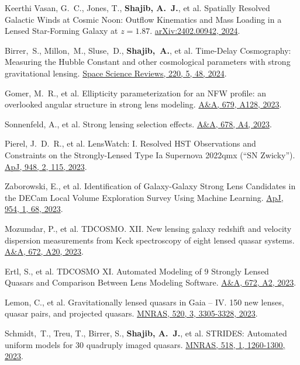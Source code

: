 \documentclass[margin, line]{res}
\begin{document}
\begin{resume}
\begin{etaremune}
	\item Keerthi Vasan, G.~C., Jones, T., \textbf{Shajib, A.~J.}, et al. Spatially Resolved Galactic Winds at Cosmic Noon: Outflow Kinematics and Mass Loading in a Lensed Star-Forming Galaxy at $z=1.87$. \href{https://arxiv.org/abs/2402.00942}{arXiv:2402.00942, 2024}.
	\item Birrer,~S., Millon,~M., Sluse,~D., \textbf{Shajib,~A.}, et al. Time-Delay Cosmography: Measuring the Hubble Constant and other cosmological parameters with strong gravitational lensing. \href{https://ui.adsabs.harvard.edu/abs/2024SSRv..220...48B/abstract}{Space Science Reviews, 220, 5, 48, 2024}.
	\item Gomer, M.~R., et al. Ellipticity parameterization for an NFW profile: an overlooked angular structure in strong lens modeling. \href{https://ui.adsabs.harvard.edu/abs/2023A\%26A...679A.128G/abstract}{A\&A, 679, A128, 2023}.
	\item Sonnenfeld, A., et al. Strong lensing selection effects. \href{https://ui.adsabs.harvard.edu/abs/2023A\%26A...678A...4S/abstract}{A\&A, 678, A4, 2023}.
	\item Pierel, J.~D.~R., et al. LensWatch: I. Resolved HST Observations and Constraints on the Strongly-Lensed Type Ia Supernova 2022qmx (``SN Zwicky'').  \href{https://ui.adsabs.harvard.edu/abs/2023ApJ...948..115P/abstract}{ApJ, 948, 2, 115, 2023}.
	\item Zaborowski, E., et al. Identification of Galaxy-Galaxy Strong Lens Candidates in the DECam Local Volume Exploration Survey Using Machine Learning. \href{https://ui.adsabs.harvard.edu/abs/2023ApJ...954...68Z/abstract}{ApJ, 954, 1, 68, 2023}.
	\item Mozumdar, P., et al. TDCOSMO. XII. New lensing galaxy redshift and velocity dispersion measurements from Keck spectroscopy of eight lensed quasar systems. \href{https://ui.adsabs.harvard.edu/abs/2023A\%26A...672A..20M/abstract}{A\&A, 672,  A20, 2023}.
	\item Ertl, S., et al. TDCOSMO XI. Automated Modeling of 9 Strongly Lensed Quasars and Comparison Between Lens Modeling Software. \href{https://ui.adsabs.harvard.edu/abs/2023A\%26A...672A...2E/abstract}{A\&A, 672, A2, 2023}.
	\item Lemon, C., et al. Gravitationally lensed quasars in Gaia -- IV. 150 new lenses, quasar pairs, and projected quasars. \href{https://ui.adsabs.harvard.edu/abs/2023MNRAS.520.3305L/abstract}{MNRAS, 520, 3, 3305-3328, 2023}.
	\item Schmidt,~T., Treu, T., Birrer, S., \textbf{Shajib, A.~J.}, et al. STRIDES: Automated uniform models for 30 quadruply imaged quasars. \href{https://ui.adsabs.harvard.edu/abs/2023MNRAS.518.1260S/abstract}{MNRAS, 518, 1, 1260-1300, 2023}.

\end{etaremune}
\end{resume}
\end{document}
